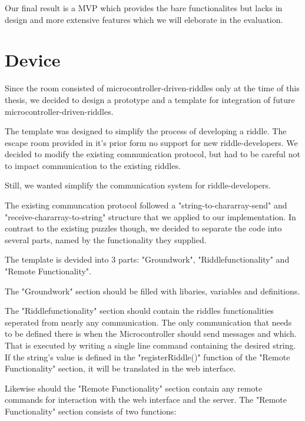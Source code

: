 Our final result is a MVP %
which provides the bare functionalites but lacks in design and more extensive features which we will eleborate in the evaluation.
\section{Device}
Since the room consisted of microcontroller-driven-riddles only at the time of this thesis, we decided to design a prototype and a template for integration of future microcontroller-driven-riddles.

The template was designed to simplify the process of developing a riddle.
The escape room provided in it's prior form no support for new riddle-developers. 
We decided to modify the existing communication protocol, but had to be careful not to impact communication to the existing riddles.

Still, we wanted simplify the communication system for riddle-developers. 

The existing communcation protocol followed a "string-to-chararray-send" and "receive-chararray-to-string" structure that we applied to our implementation.
In contrast to the existing puzzles though, we decided to separate the code into several parts, named by the functionality they supplied. 

The template is devided into 3 parts: "Groundwork", "Riddlefunctionality" and "Remote Functionality". 

The "Groundwork" section should be filled with libaries, variables and definitions. 

The "Riddlefunctionality" section should contain the riddles functionalities seperated from nearly any communication. 
The only communication that needs to be defined there is when the Microcontroller should send messages and which. That is executed by writing a single line command containing the desired string.
If the string's value is defined in the "registerRiddle()" function of the "Remote Functionality" section, it will be translated in the web interface. 

Likewise should the "Remote Functionality" section contain any remote commands for interaction with the web interface and the server.
The "Remote Functionality" section consists of two functions: 

